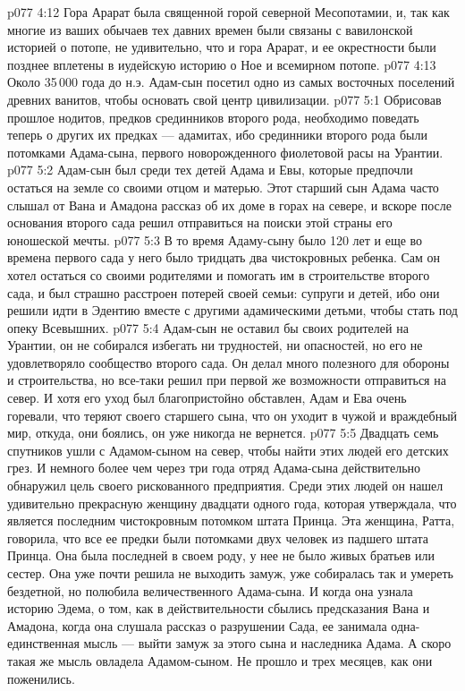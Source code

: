 \vs p077 4:12 Гора Арарат была священной горой северной Месопотамии, и, так как многие из ваших обычаев тех давних времен были связаны с вавилонской историей о потопе, не удивительно, что и гора Арарат, и ее окрестности были позднее вплетены в иудейскую историю о Ное и всемирном потопе.
\vs p077 4:13 Около 35\,000 года до н.э. Адам\hyp{}сын посетил одно из самых восточных поселений древних ванитов, чтобы основать свой центр цивилизации.
\vs p077 5:1 Обрисовав прошлое нодитов, предков срединников второго рода, необходимо поведать теперь о других их предках --- адамитах, ибо срединники второго рода были потомками Адама\hyp{}сына, первого новорожденного фиолетовой расы на Урантии.
\vs p077 5:2 \pc Адам\hyp{}сын был среди тех детей Адама и Евы, которые предпочли остаться на земле со своими отцом и матерью. Этот старший сын Адама часто слышал от Вана и Амадона рассказ об их доме в горах на севере, и вскоре после основания второго сада решил отправиться на поиски этой страны его юношеской мечты.
\vs p077 5:3 В то время Адаму\hyp{}сыну было 120 лет и еще во времена первого сада у него было тридцать два чистокровных ребенка. Сам он хотел остаться со своими родителями и помогать им в строительстве второго сада, и был страшно расстроен потерей своей семьи: супруги и детей, ибо они решили идти в Эдентию вместе с другими адамическими детьми, чтобы стать под опеку Всевышних.
\vs p077 5:4 Адам\hyp{}сын не оставил бы своих родителей на Урантии, он не собирался избегать ни трудностей, ни опасностей, но его не удовлетворяло сообщество второго сада. Он делал много полезного для обороны и строительства, но все\hyp{}таки решил при первой же возможности отправиться на север. И хотя его уход был благопристойно обставлен, Адам и Ева очень горевали, что теряют своего старшего сына, что он уходит в чужой и враждебный мир, откуда, они боялись, он уже никогда не вернется.
\vs p077 5:5 Двадцать семь спутников ушли с Адамом\hyp{}сыном на север, чтобы найти этих людей его детских грез. И немного более чем через три года отряд Адама\hyp{}сына действительно обнаружил цель своего рискованного предприятия. Среди этих людей он нашел удивительно прекрасную женщину двадцати одного года, которая утверждала, что является последним чистокровным потомком штата Принца. Эта женщина, Ратта, говорила, что все ее предки были потомками двух человек из падшего штата Принца. Она была последней в своем роду, у нее не было живых братьев или сестер. Она уже почти решила не выходить замуж, уже собиралась так и умереть бездетной, но полюбила величественного Адама\hyp{}сына. И когда она узнала историю Эдема, о том, как в действительности сбылись предсказания Вана и Амадона, когда она слушала рассказ о разрушении Сада, ее занимала одна\hyp{}единственная мысль --- выйти замуж за этого сына и наследника Адама. А скоро такая же мысль овладела Адамом\hyp{}сыном. Не прошло и трех месяцев, как они поженились.
